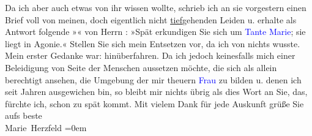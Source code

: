                Da ich aber auch etwas von ihr wissen wollte, {\pb}schrieb ich
               an sie vorgestern einen Brief voll von meinen, doch eigentlich nicht \uline{tief}gehenden Leiden u. erhalte als Antwort folgende
                  »\label{K_L02591-44v}\label{K_L02591-44h}« von Herrn \label{K_L02591-5v}\label{K_L02591-5h}: »Spät erkundigen Sie sich um \textcolor{blue}{Tante Marie}{}\ledrightnote{\textcolor{blue}{Marie Schey}}; sie liegt in Agonie.« Stellen Sie sich mein
               Entsetzen vor, da ich von nichts wusste. Mein erster Gedanke war: hinüberfahren. Da
               ich {\pb}jedoch keinesfalls mich einer Beleidigung von Seite
               der Menschen aussetzen möchte, die sich als allein berechtigt ansehen, die Umgebung
               der mir theuern \textcolor{blue}{Frau}{} zu bilden
               u. denen ich seit Jahren ausgewichen bin, so bleibt mir nichts übrig als dies Wort an
               Sie, das, fürchte ich, schon zu spät kommt. Mit vielem Dank für jede
               Auskunft\pend
           \pstart
           grüße Sie aufs beste {\\[\baselineskip]}\spacefill\mbox{Marie Herzfeld}\pend
           \leftskip=0em{}\endnumbering{}  
      